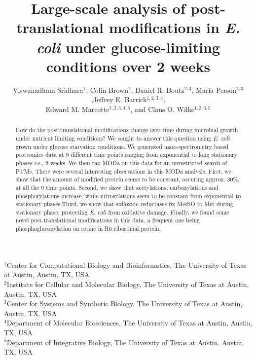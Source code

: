 \documentclass[12pt]{article}
\begin{document}
\title{Large-scale analysis of post-translational modifications in \emph{E. coli} under glucose-limiting conditions over 2 weeks}

\author{Viswanadham Sridhara$^1$, Colin Brown$^{2}$, Daniel R. Boutz$^{2,3}$, Maria Person$^{2,3}$,Jeffrey E. Barrick$^{1,2,3,4}$,\\
Edward M. Marcotte$^{1,2,3,4,5}$, and Claus O. Wilke$^{1,2,3,5}$}
\maketitle

\noindent
$^1$Center for Computational Biology and Bioinformatics, The University of Texas at Austin, Austin, TX, USA\\
$^2$Institute for Cellular and Molecular Biology, The University of Texas at Austin, Austin, TX, USA\\
$^3$Center for Systems and Synthetic Biology, The University of Texas at Austin, Austin, TX, USA\\
$^4$Department of Molecular Biosciences, The University of Texas at Austin, Austin, TX, USA\\
$^5$Department of Integrative Biology, The University of Texas at Austin, Austin, TX, USA\\


\begin{abstract}
How do the post-translational modifications change over time during microbial growth under nutrient limiting conditions? We sought to answer this question using \emph{E. coli} grown under glucose starvation conditions. We generated mass-spectrometry based proteomics data at 9 different time points ranging from exponential to long stationary phases i.e., 2 weeks. We then ran MODa on this data for an unrestricted search of PTMs. There were several interesting observations in this MODa analysis. First, we show that the amount of modified protein seems to be constant, occuring approx. 30\%, at all the 9 time points. Second, we show that acetylations, carboxylations and phosphorylations increase, while nitrosylations seem to be constant from exponential to stationary phases.Third, we show that sulfoxide reductases fix MetSO to Met during stationary phase, protecting \emph{E. coli} from oxidative damage. Finally, we found some novel post-translational modifications in this data, a frequent one being phosphogluconylation on serine in R6 ribosomal protein.
\end{abstract}

\end{document}

